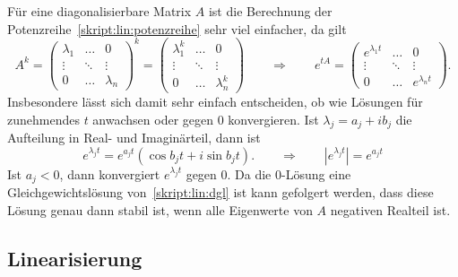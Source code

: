 Für eine diagonalisierbare Matrix $A$ ist die Berechnung der
Potenzreihe~\eqref{skript:lin:potenzreihe} sehr viel einfacher, da
gilt
\begin{equation}
A^k
=
\begin{pmatrix}
\lambda_1&\dots &0        \\
\vdots   &\ddots&\vdots   \\
0        &\dots &\lambda_n
\end{pmatrix}^k
=
\begin{pmatrix}
\lambda_1^k&\dots &0        \\
\vdots     &\ddots&\vdots   \\
0          &\dots &\lambda_n^k
\end{pmatrix}
\qquad\Rightarrow\qquad
e^{tA}
=
\begin{pmatrix}
e^{\lambda_1 t} & \dots  & 0             \\
\vdots          & \ddots &\vdots         \\
0               & \dots  &e^{\lambda_n t}
\end{pmatrix}.
\label{skript:lin:expreihe}
\end{equation}
Insbesondere lässt sich damit sehr einfach entscheiden, ob wie Lösungen
für zunehmendes $t$ anwachsen oder gegen $0$ konvergieren.
Ist $\lambda_j = a_j + ib_j$ die Aufteilung in Real- und Imaginärteil,
dann ist
\[
e^{\lambda_jt} = e^{a_jt}(\cos b_jt +i\sin b_jt).
\qquad\Rightarrow\qquad
|e^{\lambda_j t}| = e^{a_jt}
\]
Ist $a_j < 0$, dann konvergiert $e^{\lambda_jt}$ gegen $0$.
Da die $0$-Lösung eine Gleichgewichtslösung von~\eqref{skript:lin:dgl}
ist kann gefolgert werden, dass diese Lösung genau dann stabil ist, 
wenn alle Eigenwerte von $A$ negativen Realteil ist.

\subsection{Linearisierung}













